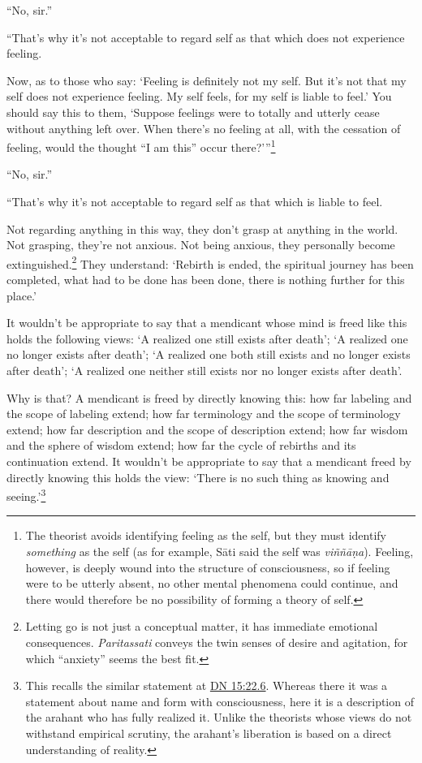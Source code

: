 \documentclass[12pt,openany]{book}%
\begin{document}
“No, sir.” 

“That’s why it’s not acceptable to regard self as that which does not experience feeling. 

Now, as to those who say: ‘Feeling is definitely not my self. But it’s not that my self does not experience feeling. My self feels, for my self is liable to feel.’ You should say this to them, ‘Suppose feelings were to totally and utterly cease without anything left over. When there’s no feeling at all, with the cessation of feeling, would the thought “I am this” occur there?’”\footnote{The theorist avoids identifying feeling as the self, but they must identify \emph{something} as the self (as for example, \textsanskrit{Sāti} said the self was \textit{\textsanskrit{viññāṇa}}). Feeling, however, is deeply wound into the structure of consciousness, so if feeling were to be utterly absent, no other mental phenomena could continue, and there would therefore be no possibility of forming a theory of self. } 

“No, sir.” 

“That’s why it’s not acceptable to regard self as that which is liable to feel. 

Not regarding anything in this way, they don’t grasp at anything in the world. Not grasping, they’re not anxious. Not being anxious, they personally become extinguished.\footnote{Letting go is not just a conceptual matter, it has immediate emotional consequences. \textit{Paritassati} conveys the twin senses of desire and agitation, for which “anxiety” seems the best fit. } They understand: ‘Rebirth is ended, the spiritual journey has been completed, what had to be done has been done, there is nothing further for this place.’ 

It wouldn’t be appropriate to say that a mendicant whose mind is freed like this holds the following views: ‘A realized one still exists after death’; ‘A realized one no longer exists after death’; ‘A realized one both still exists and no longer exists after death’; ‘A realized one neither still exists nor no longer exists after death’. 

Why is that? A mendicant is freed by directly knowing this: how far labeling and the scope of labeling extend; how far terminology and the scope of terminology extend; how far description and the scope of description extend; how far wisdom and the sphere of wisdom extend; how far the cycle of rebirths and its continuation extend. It wouldn’t be appropriate to say that a mendicant freed by directly knowing this holds the view: ‘There is no such thing as knowing and seeing.’\footnote{This recalls the similar statement at \href{https://suttacentral.net/dn15/en/sujato\#22.6}{DN 15:22.6}. Whereas there it was a statement about name and form with consciousness, here it is a description of the arahant who has fully realized it. Unlike the theorists whose views do not withstand empirical scrutiny, the arahant’s liberation is based on a direct understanding of reality. } 
\end{document}
